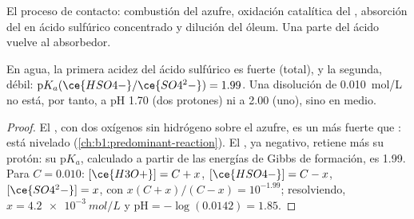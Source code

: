 \begin{omfigure}

{\small El proceso de contacto: combustión del azufre, oxidación
catalítica del , absorción del  en ácido sulfúrico
concentrado y dilución del óleum. Una parte del ácido vuelve al
absorbedor.}
\end{omfigure}

\begin{proposition}\label{prop:b1:p-block-16-18:sulfuric-strength}
En agua, la primera acidez del ácido sulfúrico es fuerte (total), y la
segunda, débil: $\mathrm{p}K_a(\ce{HSO4-}/\ce{SO4^2-}) = 1.99$. Una
disolución de \qty{0.010}{mol/L} no está, por tanto, a pH 1.70 (dos
protones) ni a 2.00 (uno), sino en medio.
\end{proposition}

\begin{proof}
El , con dos oxígenos sin hidrógeno sobre el azufre, es un
 más fuerte que : está nivelado
(\cref{ch:b1:predominant-reaction}). El , ya negativo, retiene
más su protón: su $\mathrm{p}K_a$, calculado a partir de las energías de
Gibbs de formación, es 1.99. Para $C = 0.010$: $[\ce{H3O+}] = C + x$,
$[\ce{HSO4-}] = C - x$, $[\ce{SO4^2-}] = x$, con
$x(C + x)/(C - x) = 10^{-1.99}$; resolviendo, $x = \qty{4.2e-3}{mol/L}$ y
$\mathrm{pH} = -\log(0.0142) = 1.85$.
\end{proof}

